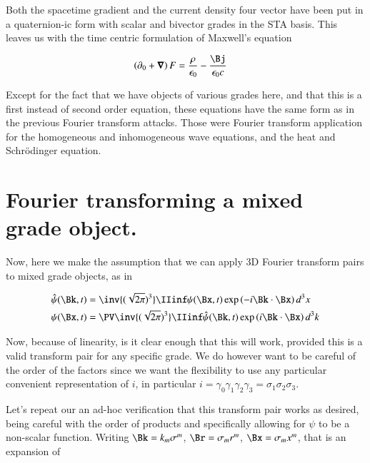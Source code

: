 Both the spacetime gradient and the current density four vector have been put in a quaternion-ic form with scalar and bivector grades in the 
STA basis.  This leaves us with the time centric formulation of Maxwell's equation

\begin{align}
\left(\partial_0 + \spacegrad\right) F &= \frac{\rho}{\epsilon_0} - \frac{\Bj}{\epsilon_0 c} 
\end{align}

Except for the fact that we have objects of various grades here, and that this is a first instead of second order equation,
these equations have the same form as in the previous Fourier transform attacks.
Those were Fourier transform application for the homogeneous and inhomogeneous wave equations, and the heat and 
Schr\"{o}dinger equation.

\section{Fourier transforming a mixed grade object. }

Now, here we make the assumption that we can apply 3D Fourier transform pairs to mixed grade objects, as in

\begin{align}\label{eqn:firstorder_fourier_maxwell:FourierTxDefinition}
\hat{\psi}(\Bk, t) &= \inv{(\sqrt{2\pi})^3} \IIinf \psi(\Bx, t) \exp\left( -i \Bk \cdot \Bx \right) d^3 x \\
{\psi}(\Bx, t) &= \PV \inv{(\sqrt{2\pi})^3} \IIinf \hat{\psi}(\Bk, t) \exp\left( i \Bk \cdot \Bx \right) d^3 k
\end{align}

Now, because of linearity, is it clear enough that this will work, provided this is a valid transform pair for any specific grade.
We do however want to be careful of the order of the factors since we want the flexibility to use any particular convenient representation
of $i$, in particular $i = \gamma_0 \gamma_1 \gamma_2 \gamma_3 = \sigma_1 \sigma_2 \sigma_3$.

Let's repeat our an ad-hoc verification that this transform pair works as desired, being careful with the order of products and specifically
allowing for $\psi$ to be a non-scalar function.  
Writing $\Bk = k_m \sigma^m$, $\Br = \sigma_m r^m$, $\Bx = \sigma_m x^m$, that is an expansion of

